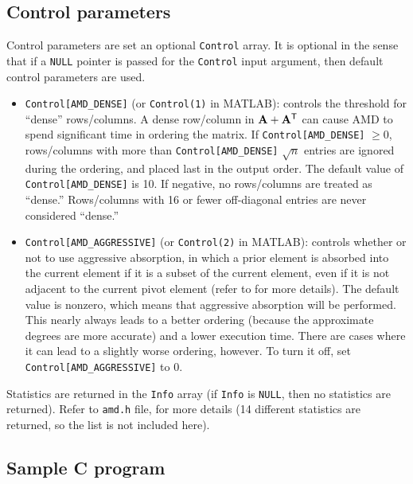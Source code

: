 \documentclass[11pt]{article}
\newcommand{\m}[1]{{\bf{#1}}}       %
\newcommand{\tr}{^{\sf T}}          %
\begin{document}
\subsection{Control parameters}
\label{control_param}

Control parameters are set an optional {\tt Control} array.
It is optional in the sense that if
a {\tt NULL} pointer is passed for the {\tt Control} input argument,
then default control parameters are used.
%
\begin{itemize}
\item {\tt Control[AMD\_DENSE]} (or {\tt Control(1)} in MATLAB):
controls the threshold for ``dense''
rows/columns.  A dense row/column in $\m{A}+\m{A}\tr$
can cause AMD to spend significant time
in ordering the matrix.  If {\tt Control[AMD\_DENSE]} $\ge 0$,
rows/columns with
more than {\tt Control[AMD\_DENSE]} $\sqrt{n}$ entries are ignored during
the ordering, and placed last in the output order.  The default
value of {\tt Control[AMD\_DENSE]} is 10.  If negative, no rows/columns
are treated as ``dense.''  Rows/columns with 16 or fewer off-diagonal
entries are never considered ``dense.''
%
\item {\tt Control[AMD\_AGGRESSIVE]} (or {\tt Control(2)} in MATLAB):
controls whether or not to use
aggressive absorption, in which a prior element is absorbed into the current
element if it is a subset of the current element, even if it is not
adjacent to the current pivot element (refer to \cite{AmestoyDavisDuff96}
for more details).  The default value is nonzero,
which means that aggressive absorption will be performed.  This nearly always
leads to a better ordering (because the approximate degrees are more
accurate) and a lower execution time.  There are cases where it can
lead to a slightly worse ordering, however.  To turn it off, set
{\tt Control[AMD\_AGGRESSIVE]} to 0.
%
\end{itemize}

Statistics are returned in the {\tt Info} array
(if {\tt Info} is {\tt NULL}, then no statistics are returned).
Refer to {\tt amd.h} file, for more details
(14 different statistics are returned, so the list is not included here).

\subsection{Sample C program}
\end{document}
